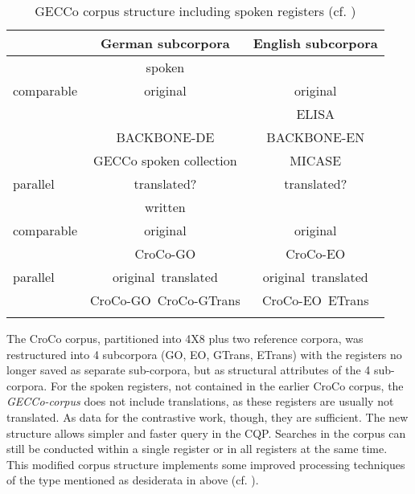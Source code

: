\documentclass[output=paper]{LSP/langsci}
\begin{document}
\begin{table}
\begin{tabularx}{\textwidth}{XCC}
\lsptoprule
 & {German subcorpora} & {English subcorpora} \\
 \midrule
 & {spoken} & \\
  \midrule
 {comparable} & {original} & {original}\\
& {} & ELISA\\
& BACKBONE-DE & BACKBONE-EN\\
& GECCo spoken collection & MICASE\\
{parallel} & {translated?} & {translated?}\\
 \midrule
& {} {written} & {}\\
 \midrule
{comparable} & {original} & {original}\\
& CroCo-GO & CroCo-EO\\
{parallel} & {original\ translated} & 
{original\ translated}\\
& CroCo-GO\ CroCo-GTrans & CroCo-EO\ ETrans\\
\lspbottomrule
\end{tabularx}
\caption{GECCo corpus structure including spoken registers (cf. \citealt{Amoia2011})}
\label{tab:steiner:GECCo}
\end{table}

The CroCo corpus, partitioned into 4X8 plus two reference corpora, was restructured into 4 subcorpora (GO, EO, GTrans, ETrans) with the registers no longer saved as separate sub-corpora, but as structural attributes of the 4 sub-corpora. For the spoken registers, not contained in the earlier CroCo corpus, the \textit{GECCo-corpus} does not include translations, as these registers are usually not translated. As data for the contrastive work, though, they are sufficient. The new structure allows simpler and faster query in the CQP. Searches in the corpus can still be conducted within a single register or in all registers at the same time. This modified corpus structure implements some improved processing techniques of the type mentioned as desiderata in  above (cf. \citealt{Amoia2011}). 
\end{document}
